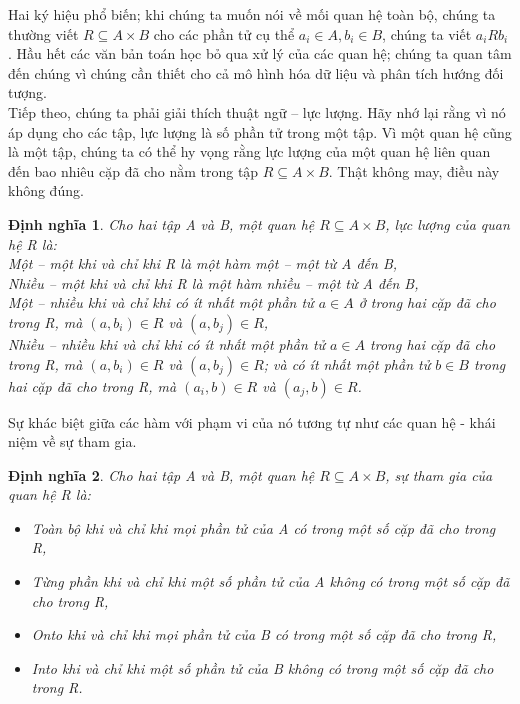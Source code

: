 \documentclass[11pt,a4paper,oneside]{article}
\newtheorem{modeling_def}{Định nghĩa }
\begin{document}
Hai ký hiệu phổ biến; khi chúng ta muốn nói về mối quan hệ toàn bộ, chúng ta thường viết $ R \subseteq A \times B $ cho các phần tử cụ thể $ a_{i} \in A, b_{i} \in B $, chúng ta viết $ a_{i} R b_{i} $. Hầu hết các văn bản toán học bỏ qua xử lý của các quan hệ; chúng ta quan tâm đến chúng vì chúng cần thiết cho cả mô hình hóa dữ liệu và phân tích hướng đối tượng.\\
Tiếp theo, chúng ta phải giải thích thuật ngữ – lực lượng. Hãy nhớ lại rằng vì nó áp dụng cho các tập, lực lượng là số phần tử trong một tập. Vì một quan hệ cũng là một tập, chúng ta có thể hy vọng rằng lực lượng của một quan hệ liên quan đến bao nhiêu cặp đã cho nằm trong tập $ R \subseteq A \times B $. Thật không may, điều này không đúng.

\begin{modeling_def}
Cho hai tập A và B, một quan hệ $ R \subseteq A \times B $, lực lượng của quan hệ R là:\\
Một – một khi và chỉ khi R là một hàm một – một từ A đến B,\\
Nhiều – một khi và chỉ khi R là một hàm nhiều – một từ A đến B,\\
Một – nhiều khi và chỉ khi có ít nhất một phần tử $ a \in A $ ở trong hai cặp đã cho trong R, mà $ (a, b_{i}) \in R $ và $ (a, b_{j}) \in R $,\\
Nhiều – nhiều khi và chỉ khi có ít nhất một phần tử $ a \in A $ trong hai cặp đã cho trong R, mà $ (a, b_{i}) \in R $ và $ (a, b_{j}) \in R $; và có ít nhất một phần tử $ b \in B $ trong hai cặp đã cho trong R, mà $ (a_{i}, b) \in R $ và $ (a_{j}, b) \in R $.
\end{modeling_def}

Sự khác biệt giữa các hàm với phạm vi của nó tương tự như các quan hệ - khái niệm về sự tham gia.
\begin{modeling_def}
Cho hai tập A và B, một quan hệ $ R \subseteq A \times B $, sự tham gia của quan hệ R là:\\
\begin{itemize}
\item Toàn bộ khi và chỉ khi mọi phần tử của A có trong một số cặp đã cho trong R,
\item Từng phần khi và chỉ khi một số phần tử của A không có trong một số cặp đã cho trong R,
\item Onto khi và chỉ khi mọi phần tử của B có trong một số cặp đã cho trong R,
\item Into khi và chỉ khi một số phần tử của B không có trong một số cặp đã cho trong R.
\end{itemize}
\end{modeling_def}
\end{document}
